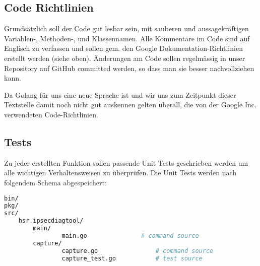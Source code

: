 \subsection{Code Richtlinien}
Grundsätzlich soll der Code gut lesbar sein, mit sauberen und aussagekräftigen Variablen-, Methoden-, und Klassennamen. Alle Kommentare im Code sind auf Englisch zu verfassen und sollen gem. den Google Dokumentation-Richtlinien erstellt werden (siehe oben).
Änderungen am Code sollen regelmässig in unser Repository auf GitHub committed werden, so dass man sie besser nachvollziehen kann.

Da Golang für uns eine neue Sprache ist und wir uns zum Zeitpunkt dieser Textstelle damit noch nicht gut auskennen gelten überall, die von der Google Inc. verwendeten Code-Richtlinien.

\subsection{Tests}
Zu jeder erstellten Funktion sollen passende Unit Tests geschrieben werden um alle wichtigen Verhaltensweisen zu überprüfen. Die Unit Tests werden nach folgendem Schema abgespeichert:

\begin{lstlisting}[language=bash]
bin/
pkg/
src/
    hsr.ipsecdiagtool/
		main/
	    		main.go               # command source
		capture/
	    		capture.go                # command source
	    		capture_test.go           # test source
\end{lstlisting}